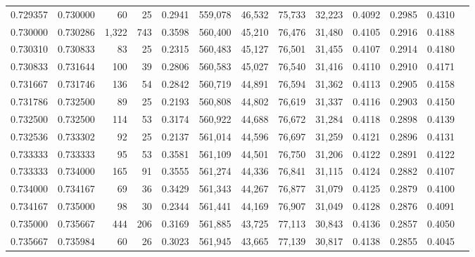\begin{tabular}{rrrrrrrrrrrrr}
0.729357 & 0.730000 &    60 &  25 &                                     0.2941 & 559,078 &  46,532 &  75,733 &  32,223 & 0.4092 & 0.2985 & 0.4310 \\
0.730000 & 0.730286 & 1,322 & 743 &                                     0.3598 & 560,400 &  45,210 &  76,476 &  31,480 & 0.4105 & 0.2916 & 0.4188 \\
0.730310 & 0.730833 &    83 &  25 &                                     0.2315 & 560,483 &  45,127 &  76,501 &  31,455 & 0.4107 & 0.2914 & 0.4180 \\
0.730833 & 0.731644 &   100 &  39 &                                     0.2806 & 560,583 &  45,027 &  76,540 &  31,416 & 0.4110 & 0.2910 & 0.4171 \\
0.731667 & 0.731746 &   136 &  54 &                                     0.2842 & 560,719 &  44,891 &  76,594 &  31,362 & 0.4113 & 0.2905 & 0.4158 \\
0.731786 & 0.732500 &    89 &  25 &                                     0.2193 & 560,808 &  44,802 &  76,619 &  31,337 & 0.4116 & 0.2903 & 0.4150 \\
0.732500 & 0.732500 &   114 &  53 &                                     0.3174 & 560,922 &  44,688 &  76,672 &  31,284 & 0.4118 & 0.2898 & 0.4139 \\
0.732536 & 0.733302 &    92 &  25 &                                     0.2137 & 561,014 &  44,596 &  76,697 &  31,259 & 0.4121 & 0.2896 & 0.4131 \\
0.733333 & 0.733333 &    95 &  53 &                                     0.3581 & 561,109 &  44,501 &  76,750 &  31,206 & 0.4122 & 0.2891 & 0.4122 \\
0.733333 & 0.734000 &   165 &  91 &                                     0.3555 & 561,274 &  44,336 &  76,841 &  31,115 & 0.4124 & 0.2882 & 0.4107 \\
0.734000 & 0.734167 &    69 &  36 &                                     0.3429 & 561,343 &  44,267 &  76,877 &  31,079 & 0.4125 & 0.2879 & 0.4100 \\
0.734167 & 0.735000 &    98 &  30 &                                     0.2344 & 561,441 &  44,169 &  76,907 &  31,049 & 0.4128 & 0.2876 & 0.4091 \\
0.735000 & 0.735667 &   444 & 206 &                                     0.3169 & 561,885 &  43,725 &  77,113 &  30,843 & 0.4136 & 0.2857 & 0.4050 \\
0.735667 & 0.735984 &    60 &  26 &                                     0.3023 & 561,945 &  43,665 &  77,139 &  30,817 & 0.4138 & 0.2855 & 0.4045 \\

\end{tabular}
